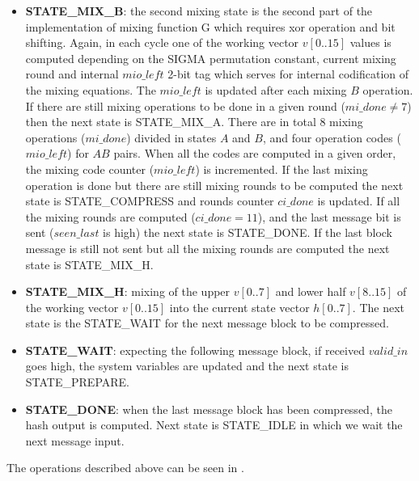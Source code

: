 \documentclass[%
	a4paper,
]
{article}
\begin{document}
\begin{itemize}
	\item \textbf{STATE_MIX_B}:  the second mixing state is the second part of the implementation of mixing function G which requires xor operation and bit shifting. Again, in each cycle one of the working vector $v[0..15]$ values is  computed depending on the SIGMA permutation constant, current mixing round and internal $mio\_left$ 2-bit tag which serves for internal codification of the mixing equations. The $mio\_left$ is updated after each mixing $B$ operation. If there are still mixing operations to be done in a given round ($mi\_done \neq 7$) then the next state is STATE_MIX_A. There are in total 8 mixing operations ($mi\_done$) divided in states $A$ and $B$, and four operation codes ($mio\_left$) for $AB$ pairs. When all the codes are computed in a given order, the mixing code counter ($mio\_left$) is incremented. If the last mixing operation is done but there are still mixing rounds to be computed the next state is STATE_COMPRESS and rounds counter $ci\_done$ is updated. If all the mixing rounds are computed ($ci\_done = 11$), and the last message bit is sent ($seen\_last$ is high) the next state is STATE_DONE. If the last block message is still not sent but all the mixing rounds are computed the next state is STATE_MIX_H.
	\item \textbf{STATE_MIX_H}: mixing of the upper $v[0..7]$ and lower half $v[8..15]$ of the working vector $v[0..15]$ into the current state vector $h[0..7]$. The next state is the STATE_WAIT for the next message block to be compressed.
	\item \textbf{STATE_WAIT}: expecting the following message block, if received $valid\_in$ goes  high, the system variables are updated and the next state is STATE_PREPARE.
	\item \textbf{STATE_DONE}: when the last message block has been compressed, the hash output is computed. Next state is STATE_IDLE in which we wait the next message input.

	      \end{itemize}		
The operations described above can be seen in .
\end{document}
